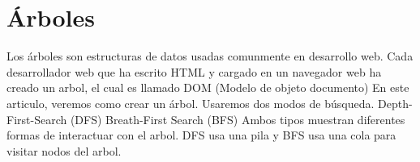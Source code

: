 \documentclass{book}
\begin{document}
\chapter {Árboles}
Los árboles son estructuras de datos usadas comunmente en desarrollo web.
Cada desarrollador web que ha escrito HTML y cargado en un navegador web ha creado un arbol, 
el cual es llamado DOM (Modelo de objeto documento)
En este articulo, veremos como crear un árbol. Usaremos dos modos de búsqueda.
Depth-First-Search (DFS) 
Breath-First Search (BFS)
Ambos tipos muestran diferentes formas de interactuar con el arbol.
DFS usa una pila y BFS usa una cola para visitar nodos del arbol.
\end{document}
